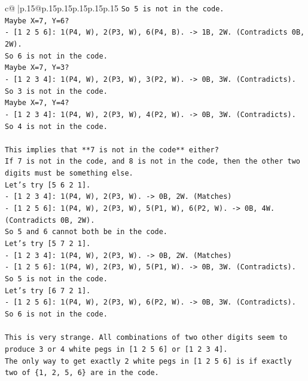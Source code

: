 \documentclass{article}
\begin{document}
{\begin{supertabular}{c@{$\;$}|p{.15\linewidth}@{}p{.15\linewidth}p{.15\linewidth}p{.15\linewidth}p{.15\linewidth}p{.15\linewidth}}
{{{\texttt{So 5 is not in the code.} \\
\texttt{Maybe X=7, Y=6?} \\
\texttt{{-} {[}1 2 5 6{]}: 1(P4, W), 2(P3, W), 6(P4, B). {-}> 1B, 2W. (Contradicts 0B, 2W).} \\
\texttt{So 6 is not in the code.} \\
\texttt{Maybe X=7, Y=3?} \\
\texttt{{-} {[}1 2 3 4{]}: 1(P4, W), 2(P3, W), 3(P2, W). {-}> 0B, 3W. (Contradicts).} \\
\texttt{So 3 is not in the code.} \\
\texttt{Maybe X=7, Y=4?} \\
\texttt{{-} {[}1 2 3 4{]}: 1(P4, W), 2(P3, W), 4(P2, W). {-}> 0B, 3W. (Contradicts).} \\
\texttt{So 4 is not in the code.} \\
\\ 
\texttt{This implies that **7 is not in the code** either?} \\
\texttt{If 7 is not in the code, and 8 is not in the code, then the other two digits must be something else.} \\
\texttt{Let's try {[}5 6 2 1{]}.} \\
\texttt{{-} {[}1 2 3 4{]}: 1(P4, W), 2(P3, W). {-}> 0B, 2W. (Matches)} \\
\texttt{{-} {[}1 2 5 6{]}: 1(P4, W), 2(P3, W), 5(P1, W), 6(P2, W). {-}> 0B, 4W. (Contradicts 0B, 2W).} \\
\texttt{So 5 and 6 cannot both be in the code.} \\
\texttt{Let's try {[}5 7 2 1{]}.} \\
\texttt{{-} {[}1 2 3 4{]}: 1(P4, W), 2(P3, W). {-}> 0B, 2W. (Matches)} \\
\texttt{{-} {[}1 2 5 6{]}: 1(P4, W), 2(P3, W), 5(P1, W). {-}> 0B, 3W. (Contradicts).} \\
\texttt{So 5 is not in the code.} \\
\texttt{Let's try {[}6 7 2 1{]}.} \\
\texttt{{-} {[}1 2 5 6{]}: 1(P4, W), 2(P3, W), 6(P2, W). {-}> 0B, 3W. (Contradicts).} \\
\texttt{So 6 is not in the code.} \\
\\ 
\texttt{This is very strange. All combinations of two other digits seem to produce 3 or 4 white pegs in {[}1 2 5 6{]} or {[}1 2 3 4{]}.} \\
\texttt{The only way to get exactly 2 white pegs in {[}1 2 5 6{]} is if exactly two of \{1, 2, 5, 6\} are in the code.} \\
}}}
\end{supertabular}}
\end{document}
